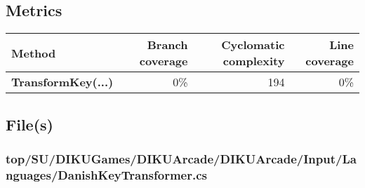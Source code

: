 \documentclass[a4paper,landscape,10pt]{article}
\begin{document}
\subsection{Metrics}
\begin{longtable}[l]{|l|r|r|r|}
\hline
\textbf{Method} & \textbf{Branch coverage} & \textbf{Cyclomatic complexity} & \textbf{Line coverage}\\
\hline
\textbf{TransformKey(...)} & 0\% & 194 & 0\%\\
\hline
\end{longtable}
\subsection{File(s)}
\subsubsection{top/SU/DIKUGames/DIKUArcade/DIKUArcade/Input/Languages/DanishKeyTransformer.cs}
\end{document}
